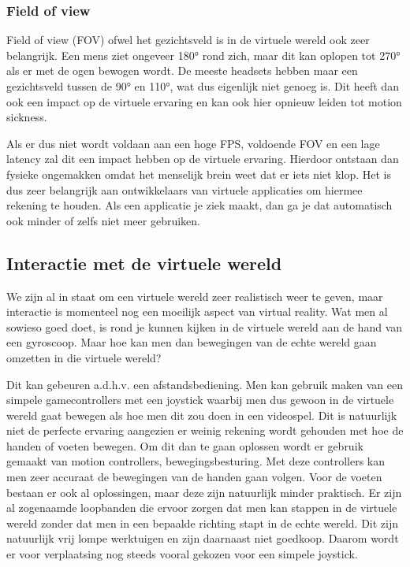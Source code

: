 \subsubsection{Field of view}
\label{ssubsec:fps}
Field of view (FOV) ofwel het gezichtsveld is in de virtuele wereld ook zeer belangrijk. Een mens ziet ongeveer 180° rond zich, maar dit kan oplopen tot 270° als er met de ogen bewogen wordt. De meeste headsets hebben maar een gezichtsveld tussen de 90° en 110°, wat dus eigenlijk niet genoeg is. Dit heeft dan ook een impact op de virtuele ervaring en kan ook hier opnieuw leiden tot motion sickness.

Als er dus niet wordt voldaan aan een hoge FPS, voldoende FOV en een lage latency zal dit  een impact hebben op de virtuele ervaring. Hierdoor ontstaan dan fysieke ongemakken omdat het menselijk brein weet dat er iets niet klop. Het is dus zeer belangrijk aan ontwikkelaars van virtuele applicaties om hiermee rekening te houden. Als een applicatie je ziek maakt, dan ga je dat automatisch ook minder of zelfs niet meer gebruiken.

\subsection{Interactie met de virtuele wereld}
\label{subsec:interactie-vr}
We  zijn al in staat om een virtuele wereld zeer realistisch weer te geven, maar interactie is momenteel nog een moeilijk aspect van virtual reality. Wat men al sowieso goed doet, is rond je kunnen kijken in de virtuele wereld aan de hand van een gyroscoop. Maar hoe kan men dan bewegingen van de echte wereld gaan omzetten in die virtuele wereld?

Dit kan gebeuren a.d.h.v. een afstandsbediening. Men kan gebruik maken van een simpele gamecontrollers met een joystick waarbij men dus gewoon in de virtuele wereld gaat bewegen als hoe men dit zou doen in een videospel. Dit is natuurlijk niet de perfecte ervaring aangezien er weinig rekening wordt gehouden met hoe de handen of voeten bewegen. Om dit dan te gaan oplossen wordt er gebruik gemaakt van motion controllers, bewegingsbesturing. Met deze controllers kan men zeer accuraat de bewegingen van de handen gaan volgen. Voor de voeten bestaan er ook al oplossingen, maar deze zijn natuurlijk minder praktisch. Er zijn al zogenaamde loopbanden die ervoor zorgen dat men kan stappen in de virtuele wereld zonder dat men in een bepaalde richting stapt in de echte wereld. Dit zijn natuurlijk vrij lompe werktuigen en zijn daarnaast niet goedkoop. Daarom wordt er voor verplaatsing nog steeds vooral gekozen voor een simpele joystick.


